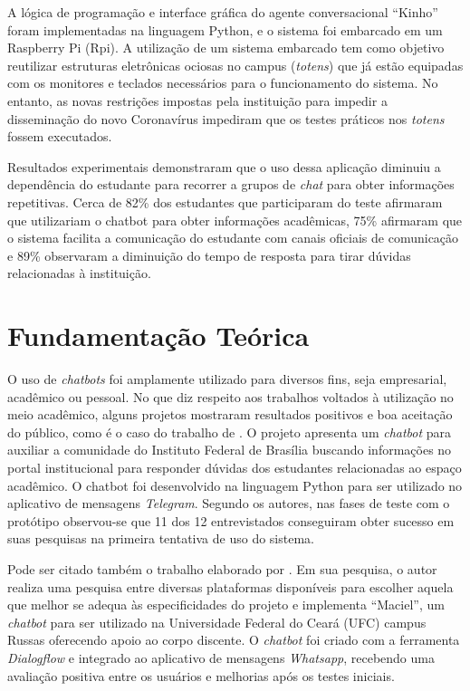 \documentclass[12pt]{article}
\begin{document}
A lógica de programação e interface gráfica do agente conversacional “Kinho” foram implementadas na linguagem Python, e o sistema foi embarcado em um Raspberry Pi (Rpi). A utilização de um sistema embarcado tem como objetivo reutilizar estruturas eletrônicas ociosas no campus ({\itshape totens}) que já estão equipadas com os monitores e teclados necessários para o funcionamento do sistema. No entanto, as novas restrições impostas pela instituição para impedir a disseminação do novo Coronavírus impediram que os testes práticos nos {\itshape totens} fossem executados.

Resultados experimentais demonstraram que o uso dessa aplicação diminuiu a dependência do estudante para recorrer a grupos de {\itshape chat} para obter informações repetitivas. Cerca de 82\% dos estudantes que participaram do teste afirmaram que utilizariam o chatbot para obter informações acadêmicas, 75\% afirmaram que o sistema facilita a comunicação do estudante com canais oficiais de comunicação e 89\% observaram a diminuição do tempo de resposta para tirar dúvidas relacionadas à instituição.


\section{ Fundamentação Teórica}

O uso de {\itshape chatbots} foi amplamente utilizado para diversos fins, seja empresarial, acadêmico ou pessoal. No que diz respeito aos trabalhos voltados à utilização no meio acadêmico, alguns projetos mostraram resultados positivos e boa aceitação do público, como é o caso do trabalho de \cite{silva:21}. O projeto apresenta um {\itshape chatbot} para auxiliar a comunidade do Instituto Federal de Brasília buscando informações no portal institucional para responder dúvidas dos estudantes relacionadas ao espaço acadêmico. O chatbot foi desenvolvido na linguagem Python para ser utilizado no aplicativo de mensagens {\itshape Telegram}. Segundo os autores, nas fases de teste com o protótipo observou-se que 11 dos 12 entrevistados conseguiram obter sucesso em suas pesquisas na primeira tentativa de uso do sistema.

Pode ser citado também o trabalho elaborado por \cite{maciel:19}. Em sua pesquisa, o autor realiza uma pesquisa entre diversas plataformas disponíveis para escolher aquela que melhor se adequa às especificidades do projeto e implementa “Maciel”, um {\itshape chatbot} para ser utilizado na Universidade Federal do Ceará (UFC) campus Russas oferecendo apoio ao corpo discente. O {\itshape chatbot} foi criado com a ferramenta {\itshape Dialogflow} e integrado ao aplicativo de mensagens {\itshape Whatsapp}, recebendo uma avaliação positiva entre os usuários e melhorias após os testes iniciais.
\end{document}
